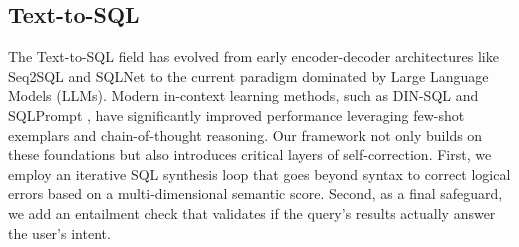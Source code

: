 \documentclass[runningheads]{llncs}
\begin{document}
\subsection{Text-to-SQL}
The Text-to-SQL field has evolved from early encoder-decoder architectures like Seq2SQL \cite{zhong2017seq2sql} and SQLNet \cite{xu2017sqlnet} to the current paradigm dominated by Large Language Models (LLMs). Modern in-context learning methods, such as DIN-SQL \cite{pourreza2023din} and SQLPrompt \cite{sun2023sqlprompt}, have significantly improved performance leveraging few-shot exemplars and chain-of-thought reasoning. Our framework not only builds on these foundations but also introduces critical layers of self-correction. First, we employ an iterative SQL synthesis loop that goes beyond syntax to correct logical errors based on a multi-dimensional semantic score. Second, as a final safeguard, we add an entailment check that validates if the query's results actually answer the user's intent. 
\end{document}

